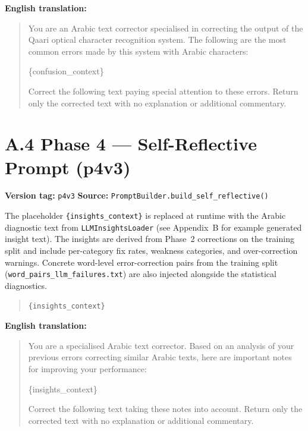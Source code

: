 \textbf{English translation:}
\begin{quote}
  You are an Arabic text corrector specialised in correcting the output of the
  Qaari optical character recognition system.
  The following are the most common errors made by this system with Arabic
  characters:

  \{confusion\_context\}

  Correct the following text paying special attention to these errors.
  Return only the corrected text with no explanation or additional commentary.
\end{quote}

\section*{A.4 \quad Phase 4 --- Self-Reflective Prompt (p4v3)}

\textbf{Version tag:} \texttt{p4v3} \quad
\textbf{Source:} \texttt{PromptBuilder.build\_self\_reflective()}

\noindent
The placeholder \texttt{\{insights\_context\}} is replaced at runtime with
the Arabic diagnostic text from \texttt{LLMInsightsLoader}
(see Appendix~B for example generated insight text).
The insights are derived from Phase~2 corrections on the training split and
include per-category fix rates, weakness categories, and over-correction
warnings. Concrete word-level error-correction pairs from the training split
(\texttt{word\_pairs\_llm\_failures.txt}) are also injected alongside
the statistical diagnostics.

\begin{quote}\itshape

  \texttt{\{insights\_context\}}

\end{quote}

\textbf{English translation:}
\begin{quote}
  You are a specialised Arabic text corrector. Based on an analysis of your
  previous errors correcting similar Arabic texts, here are important notes
  for improving your performance:

  \{insights\_context\}

  Correct the following text taking these notes into account.
  Return only the corrected text with no explanation or additional commentary.
\end{quote}

